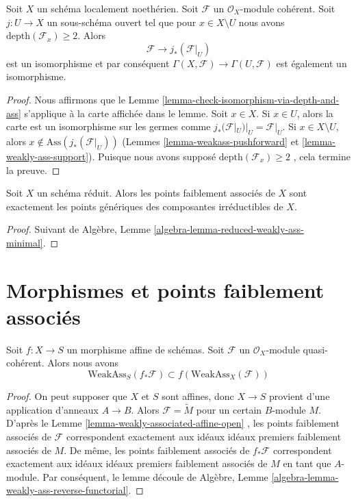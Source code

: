 \begin{lemma}
\label{lemma-depth-2-hartog}
Soit  $X$  un schéma localement noethérien. Soit  $\mathcal{F}$  un
 $\mathcal{O}_X$-module cohérent. Soit  $j : U \to X$  un sous-schéma ouvert tel que pour
 $x \in X \setminus U$  nous avons  $\text{depth}(\mathcal{F}_x) \geq 2$. Alors
$$
\mathcal{F} \longrightarrow j_*(\mathcal{F}|_U)
$$
est un isomorphisme et par conséquent  $\Gamma(X, \mathcal{F}) \to \Gamma(U, \mathcal{F})$  est également un isomorphisme.
\end{lemma}

\begin{proof}
Nous affirmons que le Lemme  \ref{lemma-check-isomorphism-via-depth-and-ass}  s'applique à la carte affichée dans le
lemme. Soit  $x \in X$. Si  $x \in U$, alors la carte est un isomorphisme sur
les germes comme  $j_*(\mathcal{F}|_U)|_U = \mathcal{F}|_U$. Si  $x \in X \setminus U$, alors  $x \not \in \text{Ass}(j_*(\mathcal{F}|_U))$  (Lemmes
 \ref{lemma-weakass-pushforward}  et  \ref{lemma-weakly-ass-support}). Puisque nous avons supposé  $\text{depth}(\mathcal{F}_x) \geq 2$ , cela
termine la preuve.
\end{proof}

\begin{lemma}
\label{lemma-weakass-reduced}
Soit  $X$  un schéma réduit. Alors les points faiblement associés de
 $X$  sont exactement les points génériques des composantes irréductibles
de  $X$.
\end{lemma}

\begin{proof}
Suivant de Algèbre, Lemme  \ref{algebra-lemma-reduced-weakly-ass-minimal}.
\end{proof}



\section{Morphismes et points faiblement associés}
\label{section-morphisms-weakly-associated}

\begin{lemma}
\label{lemma-weakly-ass-reverse-functorial}
Soit  $f : X \to S$  un morphisme affine de schémas. Soit  $\mathcal{F}$  un
 $\mathcal{O}_X$-module quasi-cohérent. Alors nous avons
$$
\text{WeakAss}_S(f_*\mathcal{F}) \subset f(\text{WeakAss}_X(\mathcal{F}))
$$
\end{lemma}

\begin{proof}
On peut supposer que  $X$  et  $S$  sont affines, donc  $X \to S$ 
provient d'une application d'anneaux  $A \to B$. Alors  $\mathcal{F} = \widetilde M$  pour un
certain  $B$-module  $M$. D'après le Lemme  \ref{lemma-weakly-associated-affine-open} , les
points faiblement associés de  $\mathcal{F}$  correspondent exactement aux idéaux
idéaux premiers faiblement associés de  $M$. De même, les points
faiblement associés de  $f_*\mathcal{F}$  correspondent exactement aux idéaux idéaux
premiers faiblement associés de  $M$  en tant que  $A$-module. Par
conséquent, le lemme découle de Algèbre, Lemme  \ref{algebra-lemma-weakly-ass-reverse-functorial}.
\end{proof}

